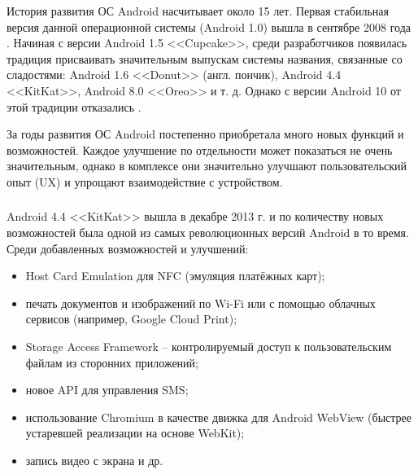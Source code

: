 История развития ОС Android насчитывает около 15 лет.
Первая стабильная версия данной операционной системы (Android 1.0) вышла в сентябре 2008 года \cite{android_first_release}.
Начиная с версии Android 1.5 <<Cupcake>>, среди разработчиков появилась традиция присваивать значительным выпускам системы названия, связанные со сладостями: Android 1.6 <<Donut>> (англ. пончик), Android 4.4 <<KitKat>>, Android 8.0 <<Oreo>> и т. д.
Однако с версии Android 10 от этой традиции отказались \cite{android_codenames}.

За годы развития ОС Android постепенно приобретала много новых функций и возможностей.
Каждое улучшение по отдельности может показаться не очень значительным, однако в комплексе они значительно улучшают пользовательский опыт (UX) и упрощают взаимодействие с устройством.


\subsubsection{}
\label{subsub:android_platform:history:kitkat}

Android 4.4 <<KitKat>> вышла в декабре 2013 г. \cite{android_release_notes} и по количеству новых возможностей была одной из самых революционных версий Android в то время.
Среди добавленных возможностей и улучшений:
\begin{itemize}
	\item Host Card Emulation для NFC (эмуляция платёжных карт);
	\item печать документов и изображений по Wi-Fi или с помощью облачных сервисов (например, Google Cloud Print);
	\item Storage Access Framework -- контролируемый доступ к пользовательским файлам из сторонних приложений;
	\item новое API для управления SMS;
	\item использование Chromium в качестве движка для Android WebView (быстрее устаревшей реализации на основе WebKit);
	\item запись видео с экрана и др. \cite{android_kitkat}
\end{itemize}


\subsubsection{}
\label{subsub:android_platform:history:lollipop}


